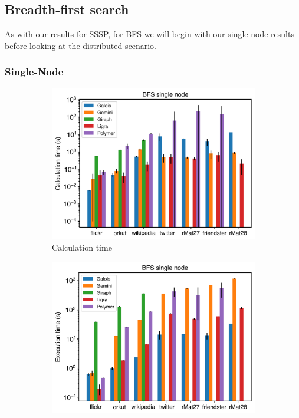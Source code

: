
\subsection{Breadth-first search}
As with our results for SSSP, for BFS we will begin with our single-node results before looking at the distributed scenario.
\subsubsection{Single-Node}
\begin{figure}
	\begin{subfigure}{0.32\textwidth}
		\includegraphics[width=\linewidth]{../../plots/singleNodeBFS_calcTime.png}
		\caption{Calculation time}
		\label{fig:singleNodeBFS_calc}
	\end{subfigure}
	\hfil
	\begin{subfigure}{0.32\textwidth}
		\includegraphics[width=\linewidth]{../../plots/singleNodeBFS_execTime.png}

\end{subfigure}
\end{figure}
